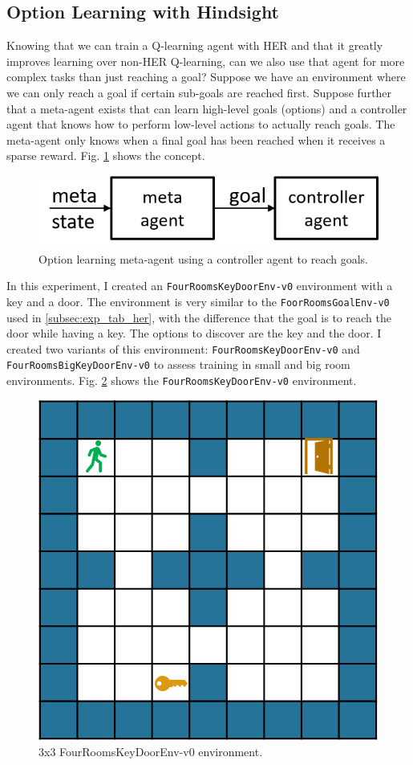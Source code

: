 \documentclass[conference]{IEEEtran}
\begin{document}
\subsection{Option Learning with Hindsight}
Knowing that we can train a Q-learning agent with HER and that it greatly improves learning over non-HER Q-learning, can we also use that agent for more complex tasks than just reaching a goal? Suppose we have an environment where we can only reach a goal if certain sub-goals are reached first. Suppose further that a meta-agent exists that can learn high-level goals (options) and a controller agent that knows how to perform low-level actions to actually reach goals. The meta-agent only knows when a final goal has been reached when it receives a sparse reward. Fig. \ref{fig:experiment_option_her_concept} shows the concept.

\begin{figure}[ht]
\centering
\includegraphics[width=0.9\columnwidth]{img/option_her_concept.png}
\caption{Option learning meta-agent using a controller agent to reach goals.}
\label{fig:experiment_option_her_concept}
\end{figure}

In this experiment, I created an \texttt{FourRoomsKeyDoorEnv-v0} environment with a key and a door. The environment is very similar to the \texttt{FoorRoomsGoalEnv-v0} used in \ref{subsec:exp_tab_her}, with the difference that the goal is to reach the door while having a key. The options to discover are the key and the door. I created two variants of this environment: \texttt{FourRoomsKeyDoorEnv-v0} and \texttt{FourRoomsBigKeyDoorEnv-v0} to assess training in small and big room environments. Fig. \ref{fig:experiment_option_her_keydoor_env} shows the \texttt{FourRoomsKeyDoorEnv-v0} environment.

\begin{figure}[ht]
\centering
\includegraphics[width=0.5\columnwidth]{img/FourRoomsKeyDoorEnv-v0.png}
\caption{3x3 FourRoomsKeyDoorEnv-v0 environment.}
\label{fig:experiment_option_her_keydoor_env}
\end{figure}
\end{document}
